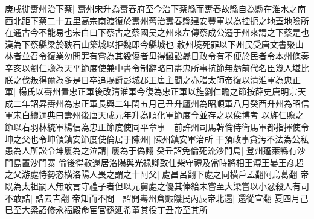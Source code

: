 庚戌徙夀州治下蔡|{
	夀州宋升為夀春府至今治下蔡縣而夀春故縣自為縣在淮水之南西北距下蔡二十五里高宗南渡復於夀州舊治夀春縣建安豐軍以為控扼之地蓋地險所在通古今不能易也宋白曰下蔡古之蔡國吴之州來左傳蔡成公遷于州來謂之下蔡是也漢為下蔡縣梁於硤石山築城以拒魏即今縣城也}
赦州境死罪以下州民受唐文書聚山林者並召令復業勿問罪有嘗為其殺傷者毋得讎訟曏日政令有不便於民者令本州條奏辛亥以劉仁贍為天平節度使兼中書令制辭略曰盡忠所事抗節無虧前代名臣幾人堪比朕之伐叛得爾為多是日卒追賜爵彭城郡王唐主聞之亦贈太師帝復以清淮軍為忠正軍|{
	楊氏以夀州置忠正軍後改清淮軍今復為忠正軍以旌劉仁贍之節按薛史唐明宗天成二年詔昇夀州為忠正軍長興二年閏五月己丑升廬州為昭順軍八月癸酉升州為昭信軍宋白續通典曰夀州後唐天成元年升為順化軍節度今並存之以俟博考}
以旌仁贍之節以右羽林統軍楊信為忠正節度使同平章事　前許州司馬韓倫侍衛馬軍都指揮使令坤之父也令坤領鎮安節度使倫居于陳州|{
	陳州鎮安軍治所}
干預政事貪汚不法為公私患為人所訟令坤屢為之泣請|{
	屢為于偽翻}
癸丑詔免倫死流沙門島|{
	登州蓬萊縣有沙門島置沙門寨}
倫後得赦還居洛陽與光禄卿致仕柴守禮及當時將相王溥王晏王彦超之父游處恃勢恣横洛陽人畏之謂之十阿父|{
	處昌呂翻下處之同横戶孟翻阿烏葛翻}
帝既為太祖嗣人無敢言守禮子者但以元舅處之優其俸給未嘗至大梁嘗以小忿殺人有司不敢詰|{
	詰去吉翻}
帝知而不問　詔開夀州倉賑饑民丙辰帝北還|{
	還從宣翻}
夏四月己巳至大梁詔修永福殿命宦官孫延希董其役丁丑帝至其所

